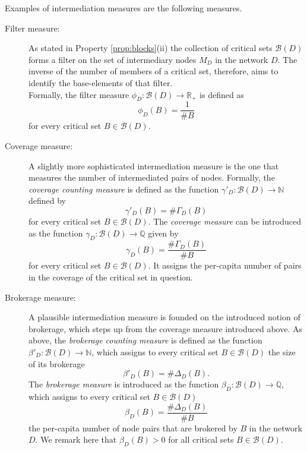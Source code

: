 Examples of intermediation measures are the following measures.
\begin{description}
\item[Filter measure:] As stated in Property \ref{prop:blocks}(ii) the collection of critical sets $\mathcal{B} (D)$ forms a filter on the set of intermediary nodes $M_D$ in the network $D$. The inverse of the number of members of a critical set, therefore, aims to identify the base-elements of that filter.
\\
Formally, the filter measure $\phi_D \colon \mathcal{B}(D) \to \mathbb{R}_+$ is defined as
\begin{equation}
\phi_D (B) = \frac{1}{\# B}
\end{equation}
for every critical set $B \in \mathcal{B} (D)$.

\item[Coverage measure:] A slightly more sophisticated intermediation measure is the one that measures the number of intermediated pairs of nodes. Formally, the \emph{coverage counting measure} is defined as the function $\gamma'_D \colon \mathcal{B} (D) \to \mathbb{N}$ defined by
\begin{equation}
\gamma'_D (B) = \# \Gamma_D (B)
\end{equation}
for every critical set $B \in \mathcal{B} (D)$. The \emph{coverage measure} can be introduced as the function $\gamma_D \colon \mathcal{B} (D) \to \mathbb{Q}$ given by
\begin{equation}
\gamma_D (B) = \frac{\# \Gamma_D (B)}{\# B}
\end{equation}
for every critical set $B \in \mathcal{B} (D)$. It assigns the per-capita number of pairs in the coverage of the critical set in question.

\item[Brokerage measure:] A plausible intermediation measure is founded on the introduced notion of brokerage, which steps up from the coverage measure introduced above. As above, the \emph{brokerage counting measure} is defined as the function $\beta'_D \colon \mathcal{B} (D) \to \mathbb{N}$, which assigns to every critical set $B \in \mathcal{B} (D)$ the size of its brokerage
\begin{equation}
\beta'_D (B) = \# \Delta_D (B) .
\end{equation}
The \emph{brokerage measure} is introduced as the function $\beta_D \colon \mathcal{B}(D) \to \mathbb{Q}$, which assigns to every critical set $B \in \mathcal{B} (D)$ 
\begin{equation} \label{eq:brokerage}
\beta_D (B) = \frac{\# \Delta_D (B)}{\# B}
\end{equation}
the per-capita number of node pairs that are brokered by $B$ in the network $D$. We remark here that $\beta_D (B) >0$ for all critical sets $B \in \mathcal{B}(D)$.


\end{description}
